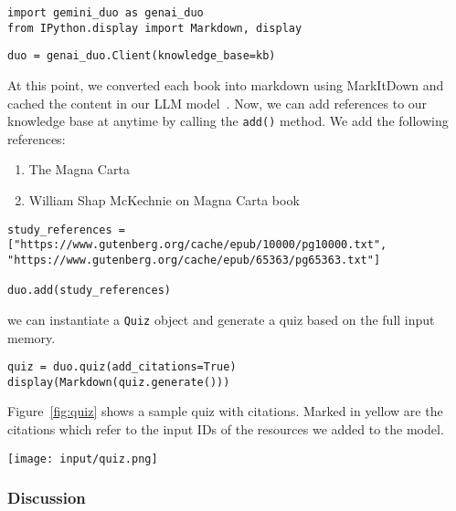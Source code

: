 \begin{verbatim}
import gemini_duo as genai_duo
from IPython.display import Markdown, display
\end{verbatim}

\begin{verbatim}
duo = genai_duo.Client(knowledge_base=kb)
\end{verbatim}

At this point, we converted each book into markdown using MarkItDown and cached the content in our LLM model~. Now, we can add references to our knowledge base at anytime by calling the \texttt{add()} method. We add the following references:
\begin{enumerate}
\item The Magna Carta
\item William Shap McKechnie on Magna Carta book
\end{enumerate}

\begin{verbatim}
study_references = ["https://www.gutenberg.org/cache/epub/10000/pg10000.txt", 
"https://www.gutenberg.org/cache/epub/65363/pg65363.txt"]

duo.add(study_references)
\end{verbatim}

we can instantiate a \texttt{Quiz} object and generate a quiz based on the full input memory.

\begin{verbatim}
quiz = duo.quiz(add_citations=True)
display(Markdown(quiz.generate()))
\end{verbatim}

Figure~\ref{fig:quiz} shows a sample quiz with citations. Marked in yellow are the citations which refer to the input IDs of the resources we added to the model.

\begin{figure*}[h!]
\centering
\texttt{[image: input/quiz.png]}
\caption{Sample Quiz with Citations.}
\label{fig:quiz}
\end{figure*}


\subsubsection{Discussion}

